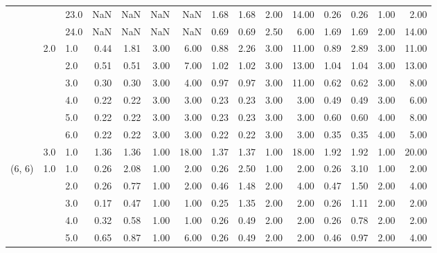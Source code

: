 \begin{tabular}{lllrrrrrrrrrrrr}
       &     & 23.0 &        NaN &       NaN &  NaN &    NaN &       1.68 &      1.68 &  2.00 &  14.00 &       0.26 &      0.26 &  1.00 &   2.00 \\
       &     & 24.0 &        NaN &       NaN &  NaN &    NaN &       0.69 &      0.69 &  2.50 &   6.00 &       1.69 &      1.69 &  2.00 &  14.00 \\
       & 2.0 & 1.0  &       0.44 &      1.81 & 3.00 &   6.00 &       0.88 &      2.26 &  3.00 &  11.00 &       0.89 &      2.89 &  3.00 &  11.00 \\
       &     & 2.0  &       0.51 &      0.51 & 3.00 &   7.00 &       1.02 &      1.02 &  3.00 &  13.00 &       1.04 &      1.04 &  3.00 &  13.00 \\
       &     & 3.0  &       0.30 &      0.30 & 3.00 &   4.00 &       0.97 &      0.97 &  3.00 &  11.00 &       0.62 &      0.62 &  3.00 &   8.00 \\
       &     & 4.0  &       0.22 &      0.22 & 3.00 &   3.00 &       0.23 &      0.23 &  3.00 &   3.00 &       0.49 &      0.49 &  3.00 &   6.00 \\
       &     & 5.0  &       0.22 &      0.22 & 3.00 &   3.00 &       0.23 &      0.23 &  3.00 &   3.00 &       0.60 &      0.60 &  4.00 &   8.00 \\
       &     & 6.0  &       0.22 &      0.22 & 3.00 &   3.00 &       0.22 &      0.22 &  3.00 &   3.00 &       0.35 &      0.35 &  4.00 &   5.00 \\
       & 3.0 & 1.0  &       1.36 &      1.36 & 1.00 &  18.00 &       1.37 &      1.37 &  1.00 &  18.00 &       1.92 &      1.92 &  1.00 &  20.00 \\
(6, 6) & 1.0 & 1.0  &       0.26 &      2.08 & 1.00 &   2.00 &       0.26 &      2.50 &  1.00 &   2.00 &       0.26 &      3.10 &  1.00 &   2.00 \\
       &     & 2.0  &       0.26 &      0.77 & 1.00 &   2.00 &       0.46 &      1.48 &  2.00 &   4.00 &       0.47 &      1.50 &  2.00 &   4.00 \\
       &     & 3.0  &       0.17 &      0.47 & 1.00 &   1.00 &       0.25 &      1.35 &  2.00 &   2.00 &       0.26 &      1.11 &  2.00 &   2.00 \\
       &     & 4.0  &       0.32 &      0.58 & 1.00 &   1.00 &       0.26 &      0.49 &  2.00 &   2.00 &       0.26 &      0.78 &  2.00 &   2.00 \\
       &     & 5.0  &       0.65 &      0.87 & 1.00 &   6.00 &       0.26 &      0.49 &  2.00 &   2.00 &       0.46 &      0.97 &  2.00 &   4.00 \\

\end{tabular}
